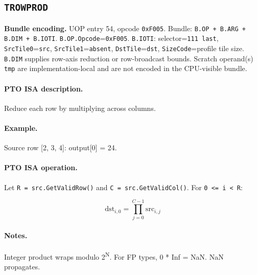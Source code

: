 \subsection{\texttt{TROWPROD}}
\noindent\textbf{Bundle encoding.} UOP entry 54, opcode \texttt{0xF005}. Bundle: \texttt{B.OP + B.ARG + B.DIM + B.IOTI}. \texttt{B.OP.Opcode}=\texttt{0xF005}. \texttt{B.IOTI}: selector=\texttt{111 last}, \texttt{SrcTile0}=\texttt{src}, \texttt{SrcTile1}=\texttt{absent}, \texttt{DstTile}=\texttt{dst}, \texttt{SizeCode}=profile tile size. \texttt{B.DIM} supplies row-axis reduction or row-broadcast bounds. Scratch operand(s) \texttt{tmp} are implementation-local and are not encoded in the CPU-visible bundle.\par\smallskip
{\small
\paragraph{PTO ISA description.}
Reduce each row by multiplying across columns.
\paragraph{Example.}
Source row [2, 3, 4]: output[0] = 24.
\par\smallskip
\paragraph{PTO ISA operation.}
Let \texttt{R = src.GetValidRow()} and \texttt{C = src.GetValidCol()}. For \texttt{0 \textless{}= i \textless{} R}:

\[
\mathrm{dst}_{i,0} = \prod_{j=0}^{C-1} \mathrm{src}_{i,j}
\]
}\par\smallskip
\paragraph{Notes.}
Integer product wraps modulo 2\textsuperscript{N}. For FP types, 0 * Inf = NaN. NaN propagates.

